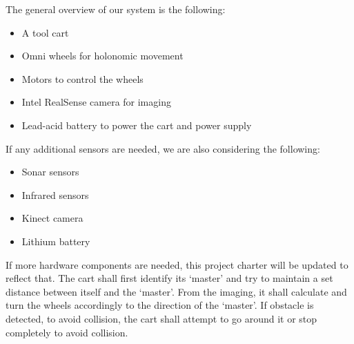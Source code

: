 The general overview of our system is the following:
\begin{itemize}
	\item A tool cart
	\item Omni wheels for holonomic movement
	\item Motors to control the wheels
	\item Intel RealSense camera for imaging
	\item Lead-acid battery to power the cart and power supply
\end{itemize}
If any additional  sensors are needed, we are also considering the following:
\begin{itemize}
	\item Sonar sensors
	\item Infrared sensors
	\item Kinect camera
	\item Lithium battery
\end{itemize}
If more hardware components are needed, this project charter will be updated to reflect that. The cart shall first identify its `master' and try to maintain a set distance between itself and the `master'. From the imaging, it shall calculate and turn the wheels accordingly to the direction of the `master'. If obstacle is detected, to avoid collision, the cart shall attempt to go around it or stop completely to avoid collision.